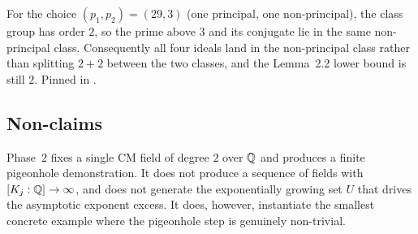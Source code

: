 \begin{verification}\label{ver:lemma22_mixed}
For the choice $(p_1, p_2) = (29, 3)$ (one principal, one
non-principal), the class group has order $2$, so the prime above $3$
and its conjugate lie in the same non-principal class. Consequently all
four ideals land in the non-principal class rather than splitting
$2 + 2$ between the two classes, and the Lemma~2.2 lower bound is still
$2$.
Pinned in .
\end{verification}

\subsection{Non-claims}

Phase~2 fixes a single CM field of degree $2$ over $\mathbb{Q}$ and produces a
finite pigeonhole demonstration. It does not produce a sequence of
fields with $[K_j : \mathbb{Q}] \to \infty$, and does not generate the
exponentially growing set $U$ that drives the asymptotic exponent
excess. It does, however, instantiate the smallest concrete example
where the pigeonhole step is genuinely non-trivial.
